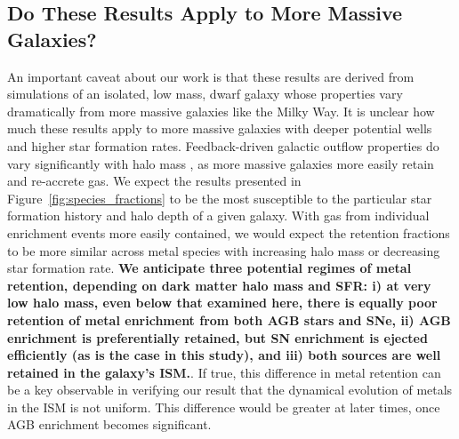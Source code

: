 \documentclass[twocolumn]{aastex61}
\begin{document}
\subsection{Do These Results Apply to More Massive Galaxies?}
\label{sec:massive galaxies}
   An 
important caveat about our work is that these results are derived from simulations of an isolated, low mass, dwarf galaxy whose properties vary dramatically from more massive galaxies like the Milky Way. It is unclear how much these results apply to more massive galaxies 
     with
deeper potential wells and higher star formation rates. Feedback-driven galactic outflow properties do vary significantly with halo mass \citep[e.g.][]{MacLowFerrara1999,Muratov2017}, as more massive galaxies more easily retain and re-accrete gas. We expect the results presented in Figure~\ref{fig:species_fractions} to be the most susceptible to the particular star formation history and halo depth of a given galaxy. With gas from individual enrichment events more easily contained, we would expect the retention fractions to be more similar across metal species with increasing halo mass or decreasing star formation rate. \textbf{We anticipate three potential regimes of metal retention, 
    depending on
dark matter halo mass and SFR: i) at very low halo mass, even below that examined here, there is equally poor retention of metal enrichment from both AGB 
    stars 
and SNe, ii) AGB enrichment is preferentially retained, but SN enrichment is ejected efficiently (as is the case in this study), and iii) both sources are well retained in the galaxy's ISM.}. If true, this difference in metal retention can be a key observable in verifying our result that the dynamical evolution of metals in the ISM is not uniform.
This difference would be greater at later times, once AGB enrichment becomes significant. 
\end{document}
